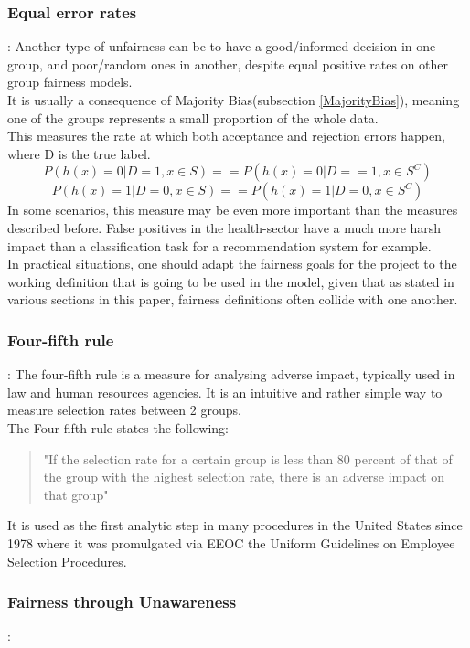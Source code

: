 \subsubsection{Equal error rates}:\cite{21c}
Another type of unfairness can be to have a good/informed decision in one group, and poor/random ones in another, despite equal positive rates on other group fairness models. \\
It is usually a consequence of Majority Bias(subsection \ref{MajorityBias}), meaning one of the groups  represents a small proportion of the whole data.\\

This measures the rate at which both acceptance and rejection errors happen, where D is the true label.
$$P(h(x) = 0|D = 1, x \in S) == P(h(x) = 0|D ==1, x \in S^C)$$
$$P(h(x) = 1|D = 0, x \in S) == P(h(x) = 1|D=0, x \in S^C)$$
In some scenarios, this measure may be even more important than the measures described before. False positives in the health-sector have a much more harsh impact than a classification task for a recommendation system for example.\\ In practical situations, one should adapt the fairness goals for the project to the working definition that is going to be used in the model, given that as stated in various sections in this paper, fairness definitions often collide with one another.

\subsubsection{Four-fifth rule}:
The four-fifth rule is a measure for analysing adverse impact, typically used in law and human resources agencies. It is an intuitive and rather simple way to measure selection rates between 2 groups.\\
The Four-fifth rule states the following:
\begin{quote} "If the selection rate for a certain group is less than 80 percent of that of the group with the highest selection rate, there is an adverse impact on that group" \end{quote}
It is used as the first analytic step in many procedures in the United States since 1978 where it was promulgated via EEOC the Uniform Guidelines on Employee Selection Procedures.

\subsubsection{Fairness through Unawareness}:

